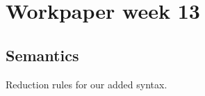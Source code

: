 

\author{Group D608F16}
\title{}



\maketitle

\section{Workpaper week 13}

\subsection{Semantics}
Reduction rules for our added syntax.







\grid
\grids
